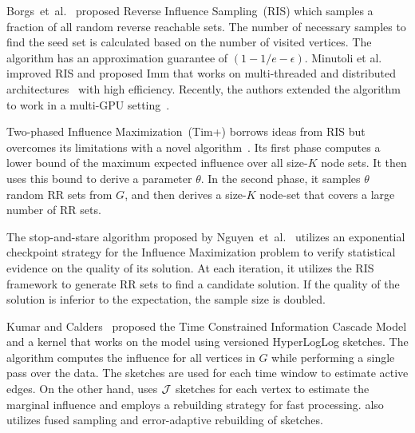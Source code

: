 \documentclass[review]{elsarticle}
\newcommand\acro{{\sc{HyperFuseR\xspace}\xspace}\xspace}
\begin{document}
Borgs~et~al.~\cite{borgs2014maximizing} proposed Reverse Influence Sampling~(RIS) which samples a fraction of all random reverse reachable sets. The number of necessary samples to find the seed set is calculated based on the number of visited vertices. The algorithm has an approximation guarantee of $(1-1/e-\epsilon)$. Minutoli et al. improved RIS and proposed {\sc Imm} that works on multi-threaded and distributed architectures~\cite{minutoli2019fast} with high efficiency. Recently, the authors extended the algorithm to work in a multi-GPU setting~\cite{curipples}.

Two-phased Influence Maximization~({\sc Tim+}) borrows ideas from RIS but overcomes its limitations with a novel algorithm~\cite{tim}. Its first phase computes a lower bound of the maximum expected influence over all size-$K$ node sets. It then uses this bound to derive a parameter $\theta$. In the second phase, it samples $\theta$ random RR sets from $G$, and then derives a size-$K$ node-set that covers a large number of RR sets.

The stop-and-stare algorithm proposed by Nguyen~et~al.~\cite{nguyen2016stop} utilizes an exponential checkpoint strategy for the Influence Maximization problem to verify statistical evidence on the quality of its solution. At each iteration, it utilizes the RIS framework to generate RR sets to find a candidate solution. If the quality of the solution is inferior to the expectation, the sample size is doubled.



Kumar and Calders~\cite{kumar2017information} proposed the Time Constrained Information Cascade Model and a kernel that works on the model using versioned HyperLogLog sketches. The algorithm computes the influence for all vertices in $G$ while performing a single pass over the data. The sketches are used for each time window to estimate active edges. On the other hand, \acro uses ${\cal J}$ sketches for each vertex to estimate the marginal influence and employs a rebuilding strategy for fast processing. \acro also utilizes fused sampling and error-adaptive rebuilding of sketches.
\end{document}
